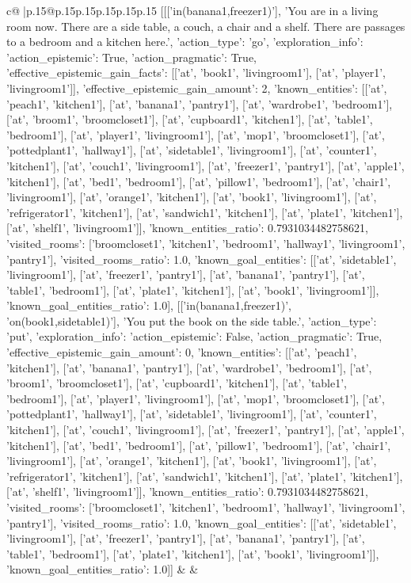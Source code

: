 \documentclass{article}
\begin{document}
{\begin{supertabular}{c@{$\;$}|p{.15\linewidth}@{}p{.15\linewidth}p{.15\linewidth}p{.15\linewidth}p{.15\linewidth}p{.15\linewidth}}
{{{	 [[['in(banana1,freezer1)'], 'You are in a living room now. There are a side table, a couch, a chair and a shelf. There are passages to a bedroom and a kitchen here.', {'action_type': 'go', 'exploration_info': {'action_epistemic': True, 'action_pragmatic': True, 'effective_epistemic_gain_facts': [['at', 'book1', 'livingroom1'], ['at', 'player1', 'livingroom1']], 'effective_epistemic_gain_amount': 2, 'known_entities': [['at', 'peach1', 'kitchen1'], ['at', 'banana1', 'pantry1'], ['at', 'wardrobe1', 'bedroom1'], ['at', 'broom1', 'broomcloset1'], ['at', 'cupboard1', 'kitchen1'], ['at', 'table1', 'bedroom1'], ['at', 'player1', 'livingroom1'], ['at', 'mop1', 'broomcloset1'], ['at', 'pottedplant1', 'hallway1'], ['at', 'sidetable1', 'livingroom1'], ['at', 'counter1', 'kitchen1'], ['at', 'couch1', 'livingroom1'], ['at', 'freezer1', 'pantry1'], ['at', 'apple1', 'kitchen1'], ['at', 'bed1', 'bedroom1'], ['at', 'pillow1', 'bedroom1'], ['at', 'chair1', 'livingroom1'], ['at', 'orange1', 'kitchen1'], ['at', 'book1', 'livingroom1'], ['at', 'refrigerator1', 'kitchen1'], ['at', 'sandwich1', 'kitchen1'], ['at', 'plate1', 'kitchen1'], ['at', 'shelf1', 'livingroom1']], 'known_entities_ratio': 0.7931034482758621, 'visited_rooms': ['broomcloset1', 'kitchen1', 'bedroom1', 'hallway1', 'livingroom1', 'pantry1'], 'visited_rooms_ratio': 1.0, 'known_goal_entities': [['at', 'sidetable1', 'livingroom1'], ['at', 'freezer1', 'pantry1'], ['at', 'banana1', 'pantry1'], ['at', 'table1', 'bedroom1'], ['at', 'plate1', 'kitchen1'], ['at', 'book1', 'livingroom1']], 'known_goal_entities_ratio': 1.0}}], [['in(banana1,freezer1)', 'on(book1,sidetable1)'], 'You put the book on the side table.', {'action_type': 'put', 'exploration_info': {'action_epistemic': False, 'action_pragmatic': True, 'effective_epistemic_gain_amount': 0, 'known_entities': [['at', 'peach1', 'kitchen1'], ['at', 'banana1', 'pantry1'], ['at', 'wardrobe1', 'bedroom1'], ['at', 'broom1', 'broomcloset1'], ['at', 'cupboard1', 'kitchen1'], ['at', 'table1', 'bedroom1'], ['at', 'player1', 'livingroom1'], ['at', 'mop1', 'broomcloset1'], ['at', 'pottedplant1', 'hallway1'], ['at', 'sidetable1', 'livingroom1'], ['at', 'counter1', 'kitchen1'], ['at', 'couch1', 'livingroom1'], ['at', 'freezer1', 'pantry1'], ['at', 'apple1', 'kitchen1'], ['at', 'bed1', 'bedroom1'], ['at', 'pillow1', 'bedroom1'], ['at', 'chair1', 'livingroom1'], ['at', 'orange1', 'kitchen1'], ['at', 'book1', 'livingroom1'], ['at', 'refrigerator1', 'kitchen1'], ['at', 'sandwich1', 'kitchen1'], ['at', 'plate1', 'kitchen1'], ['at', 'shelf1', 'livingroom1']], 'known_entities_ratio': 0.7931034482758621, 'visited_rooms': ['broomcloset1', 'kitchen1', 'bedroom1', 'hallway1', 'livingroom1', 'pantry1'], 'visited_rooms_ratio': 1.0, 'known_goal_entities': [['at', 'sidetable1', 'livingroom1'], ['at', 'freezer1', 'pantry1'], ['at', 'banana1', 'pantry1'], ['at', 'table1', 'bedroom1'], ['at', 'plate1', 'kitchen1'], ['at', 'book1', 'livingroom1']], 'known_goal_entities_ratio': 1.0}}]] 
	  } 
	   } 
	   } 
	 & & \\ 
 


\end{supertabular}}
\end{document}
